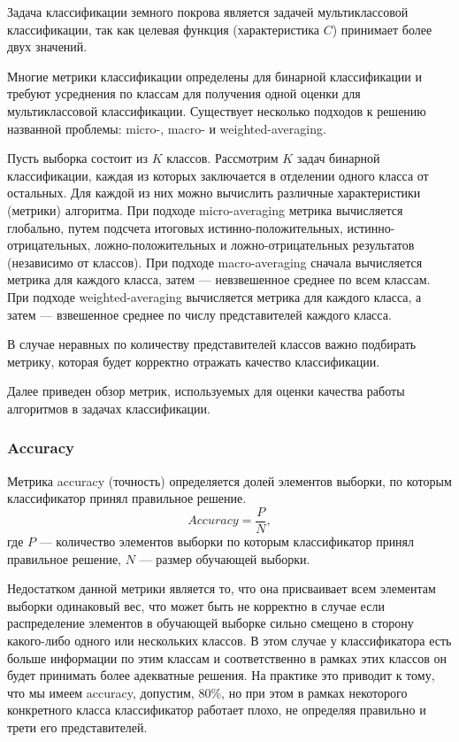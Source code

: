 \documentclass[14pt, a4paper, oneside]{extarticle}
\begin{document}
Задача классификации земного покрова является задачей мультиклассовой классификации, так как целевая функция (характеристика $C$) принимает более двух значений.

Многие метрики классификации определены для бинарной классификации и требуют усреднения по классам для получения одной оценки для мультиклассовой классификации. Существует несколько подходов к решению названной проблемы: micro-, macro- и weighted-averaging.

Пусть выборка состоит из $K$ классов. Рассмотрим $K$ задач бинарной классификации, каждая из которых заключается в отделении одного класса от остальных. Для каждой из них можно вычислить различные характеристики (метрики) алгоритма. При подходе micro-averaging метрика вычисляется глобально, путем подсчета итоговых истинно-положительных, истинно-отрицательных, ложно-положительных и ложно-отрицательных результатов (независимо от классов). При подходе macro-averaging сначала вычисляется метрика для каждого класса, затем --- невзвешенное среднее по всем классам. При подходе weighted-averaging вычисляется метрика для каждого класса, а затем --- взвешенное среднее по числу представителей каждого класса.

В случае неравных по количеству представителей классов важно подбирать метрику, которая будет корректно отражать качество классификации.

Далее приведен обзор метрик, используемых для оценки качества работы алгоритмов в задачах классификации.

\subsubsection{Accuracy}
Метрика accuracy (точность) определяется долей элементов выборки, по которым классификатор принял правильное решение.
$$Accuracy = \frac{P}{N},$$
где $P$ --- количество элементов выборки по которым классификатор принял правильное решение, $N$ --- размер обучающей выборки.

Недостатком данной метрики является то, что она присваивает всем элементам выборки одинаковый вес, что может быть не корректно в случае если распределение элементов в обучающей выборке сильно смещено в сторону какого-либо одного или нескольких классов. В этом случае у классификатора есть больше информации по этим классам и соответственно в рамках этих классов он будет принимать более адекватные решения. На практике это приводит к тому, что мы имеем accuracy, допустим, 80\%, но при этом в рамках некоторого конкретного класса классификатор работает плохо, не определяя правильно и трети его представителей.
\end{document}
